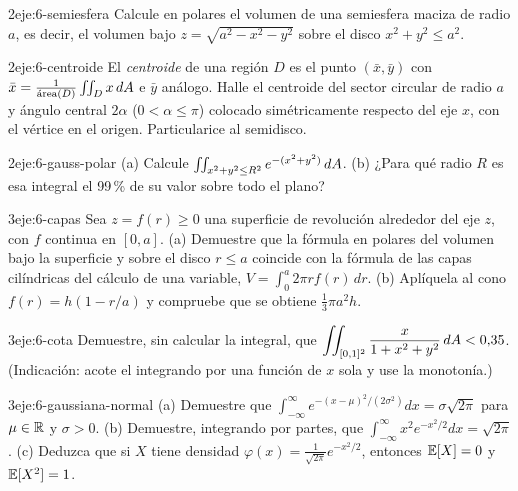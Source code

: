 \begin{ejercicio}{2}{eje:6-semiesfera}
Calcule en polares el volumen de una semiesfera maciza de radio $a$, es decir, el volumen bajo $z=\sqrt{a^2-x^2-y^2}$ sobre el disco $x^2+y^2\le a^2$.
\end{ejercicio}

\begin{ejercicio}{2}{eje:6-centroide}
El \emph{centroide} de una región $D$ es el punto $(\bar x,\bar y)$ con $\bar x=\frac{1}{\text{área}(D)}\iint_Dx\,dA$ e $\bar y$ análogo. Halle el centroide del sector circular de radio $a$ y ángulo central $2\alpha$ ($0<\alpha\le\pi$) colocado simétricamente respecto del eje $x$, con el vértice en el origen. Particularice al semidisco.
\end{ejercicio}

\begin{ejercicio}{2}{eje:6-gauss-polar}
(a) Calcule $\iint_{x^2+y^2\le R^2}e^{-(x^2+y^2)}\,dA$. (b) ¿Para qué radio $R$ es esa integral el 99\,\% de su valor sobre todo el plano?
\end{ejercicio}

\begin{ejercicio}{3}{eje:6-capas}
Sea $z=f(r)\ge0$ una superficie de revolución alrededor del eje $z$, con $f$ continua en $[0,a]$. (a) Demuestre que la fórmula en polares del volumen bajo la superficie y sobre el disco $r\le a$ coincide con la fórmula de las capas cilíndricas del cálculo de una variable, $V=\int_0^a2\pi r f(r)\,dr$. (b) Aplíquela al cono $f(r)=h(1-r/a)$ y compruebe que se obtiene $\frac13\pi a^2h$.
\end{ejercicio}

\begin{ejercicio}{3}{eje:6-cota}
Demuestre, sin calcular la integral, que $\displaystyle\iint_{[0,1]^2}\frac{x}{1+x^2+y^2}\,dA<0{,}35$. (Indicación: acote el integrando por una función de $x$ sola y use la monotonía.)
\end{ejercicio}

\begin{ejercicio}{3}{eje:6-gaussiana-normal}
(a) Demuestre que $\int_{-\infty}^{\infty}e^{-(x-\mu)^2/(2\sigma^2)}dx=\sigma\sqrt{2\pi}$ para $\mu\in\mathbb{R}$ y $\sigma>0$. (b) Demuestre, integrando por partes, que $\int_{-\infty}^{\infty}x^2e^{-x^2/2}dx=\sqrt{2\pi}$. (c) Deduzca que si $X$ tiene densidad $\varphi(x)=\frac1{\sqrt{2\pi}}e^{-x^2/2}$, entonces $\mathbb{E}[X]=0$ y $\mathbb{E}[X^2]=1$.
\end{ejercicio}
